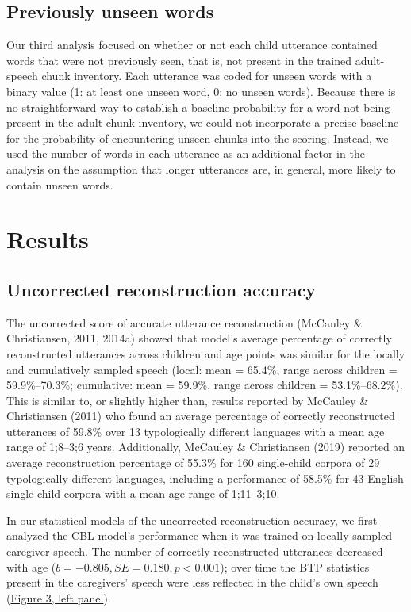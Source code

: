 \documentclass[man,mask,floatsintext]{apa6}
\theoremstyle{definition}
\theoremstyle{definition}
\theoremstyle{definition}
\theoremstyle{remark}
\begin{document}
\subsection{Previously unseen words}\label{previously-unseen-words}

Our third analysis focused on whether or not each child utterance
contained words that were not previously seen, that is, not present in
the trained adult-speech chunk inventory. Each utterance was coded for
unseen words with a binary value (1: at least one unseen word, 0: no
unseen words). Because there is no straightforward way to establish a
baseline probability for a word not being present in the adult chunk
inventory, we could not incorporate a precise baseline for the
probability of encountering unseen chunks into the scoring. Instead, we
used the number of words in each utterance as an additional factor in
the analysis on the assumption that longer utterances are, in general,
more likely to contain unseen words.

\section{Results}\label{results}

\subsection{Uncorrected reconstruction
accuracy}\label{uncorrected-reconstruction-accuracy}

The uncorrected score of accurate utterance reconstruction (McCauley \&
Christiansen, 2011, 2014a) showed that model's average percentage of
correctly reconstructed utterances across children and age points was
similar for the locally and cumulatively sampled speech (local: mean =
65.4\%, range across children = 59.9\%--70.3\%; cumulative: mean =
59.9\%, range across children = 53.1\%--68.2\%). This is similar to, or
slightly higher than, results reported by McCauley \& Christiansen
(2011) who found an average percentage of correctly reconstructed
utterances of 59.8\% over 13 typologically different languages with a
mean age range of 1;8--3;6 years. Additionally, McCauley \& Christiansen
(2019) reported an average reconstruction percentage of 55.3\% for 160
single-child corpora of 29 typologically different languages, including
a performance of 58.5\% for 43 English single-child corpora with a mean
age range of 1;11--3;10.

In our statistical models of the uncorrected reconstruction accuracy, we
first analyzed the CBL model's performance when it was trained on
locally sampled caregiver speech. The number of correctly reconstructed
utterances decreased with age (\(b = -0.805, SE = 0.180, p < 0.001\));
over time the BTP statistics present in the caregivers' speech were less
reflected in the child's own speech (\protect\hyperlink{fig3}{Figure 3,
left panel}).
\end{document}

